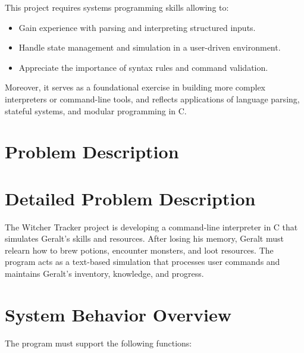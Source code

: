 \documentclass{article}
\begin{document}
This project requires systems programming skills allowing to:
\begin{itemize}
    \item Gain experience with parsing and interpreting structured inputs.
    \item Handle state management and simulation in a user-driven environment.
    \item Appreciate the importance of syntax rules and command validation.
\end{itemize}

Moreover, it serves as a foundational exercise in building more complex interpreters or command-line tools, and reflects applications of language parsing, stateful systems, and modular programming in C.

\section{Problem Description}
\section*{Detailed Problem Description}

The Witcher Tracker project is developing a command-line interpreter in C that simulates Geralt’s skills and resources. After losing his memory, Geralt must relearn how to brew potions, encounter monsters, and loot resources. The program acts as a text-based simulation that processes user commands and maintains Geralt’s inventory, knowledge, and progress.

\section*{System Behavior Overview}

The program must support the following functions:
\end{document}
